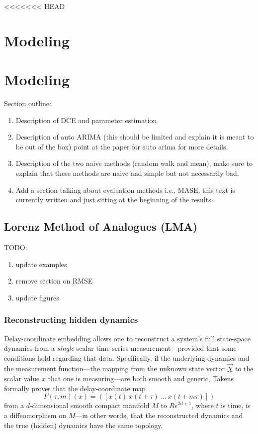 <<<<<<< HEAD
\section{Modeling}
\label{sec:compModel}

\section{Modeling}

Section outline:

\begin{enumerate}

\item Description of DCE and parameter estimation  
\item Description of auto ARIMA 
\subitem (this should be limited and explain it is meant to be out of the box) point at the paper for auto arima for more details.
\item Description of the two naive methods (random walk and mean), make sure to explain that these methods are naive and simple but not necessarily bad.
\item\cmark Add a section talking about evaluation methods i.e., MASE, this text is currently written and just sitting at the beginning of the results. 

\end{enumerate}

\subsection{Lorenz Method of Analogues (LMA)}
TODO:
\begin{enumerate}
\item update examples
\item remove section on RMSE
\item update figures
\end{enumerate}


 \subsubsection{Reconstructing hidden dynamics}



Delay-coordinate embedding allows one to reconstruct a system's full
state-space dynamics from a \emph{single} scalar time-series
measurement---provided that some conditions hold regarding that data.
Specifically, if the underlying dynamics and the measurement
function---the mapping from the unknown state vector $\vec{X}$ to the
scalar value $x$ that one is measuring---are both smooth and generic,
Takens~\cite{takens} formally proves that the delay-coordinate map
\[
F(\tau,m)(x) = ([x(t) ~ x(t+\tau) ~ \dots ~x(t+m\tau)])
\]
from a $d$-dimensional smooth compact manifold $M$ to ${Re}^{2d+1}$,
where $t$ is time, is a diffeomorphism on $M$---in other words, that
the reconstructed dynamics and the true (hidden) dynamics have the
same topology.

